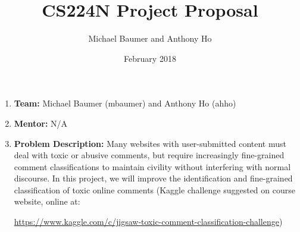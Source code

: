 \documentclass{article}
\title{CS224N Project Proposal}
\author{Michael Baumer and Anthony Ho}
\date{February 2018}
\begin{document}
\maketitle

\begin{enumerate}
    \item \textbf{Team:} Michael Baumer (mbaumer) and Anthony Ho (ahho)
    \item \textbf{Mentor:} N/A
    \item \textbf{Problem Description:} Many websites with user-submitted content must deal with toxic or abusive comments, but require increasingly fine-grained comment classifications to maintain civility without interfering with normal discourse. In this project, we will improve the identification and fine-grained classification of toxic online comments (Kaggle challenge suggested on course website, online at:
    
    \url{https://www.kaggle.com/c/jigsaw-toxic-comment-classification-challenge})
    

\end{enumerate}
\end{document}
